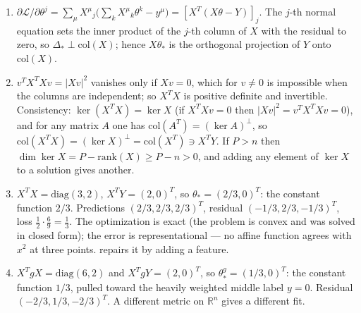 \documentclass[11pt]{article}
\newcommand{\R}{\mathbb{R}}
\newcommand{\CL}{{\mathcal L}}
\newcommand{\pd}{\partial}
\begin{document}
\begin{solution}
\begin{enumerate}
    \item $\pd\CL/\pd\theta^j = \sum_\mu X^\mu{}_j\big(\sum_k X^\mu{}_k\theta^k - y^\mu\big) = [X^T(X\theta-Y)]_j$. The $j$-th normal equation sets the inner product of the $j$-th column of $X$ with the residual to zero, so $\Delta_*\perp\mathrm{col}(X)$; hence $X\theta_*$ is the orthogonal projection of $Y$ onto $\mathrm{col}(X)$.
    \item $v^TX^TXv = |Xv|^2$ vanishes only if $Xv=0$, which for $v\neq 0$ is impossible when the columns are independent; so $X^TX$ is positive definite and invertible. Consistency: $\ker(X^TX) = \ker X$ (if $X^TXv=0$ then $|Xv|^2 = v^TX^TXv = 0$), and for any matrix $A$ one has $\mathrm{col}(A^T) = (\ker A)^\perp$, so $\mathrm{col}(X^TX) = (\ker X)^\perp = \mathrm{col}(X^T)\ni X^TY$. If $P>n$ then $\dim\ker X = P-\mathrm{rank}(X)\geq P-n>0$, and adding any element of $\ker X$ to a solution gives another.
    \item $X^TX = \mathrm{diag}(3,2)$, $X^TY = (2,0)^T$, so $\theta_* = (2/3,0)^T$: the constant function $2/3$. Predictions $(2/3,2/3,2/3)^T$, residual $(-1/3,2/3,-1/3)^T$, loss $\frac{1}{2}\cdot\frac{6}{9} = \frac{1}{3}$. The optimization is exact (the problem is convex and was solved in closed form); the error is representational --- no affine function agrees with $x^2$ at three points.  repairs it by adding a feature.
    \item $X^TgX = \mathrm{diag}(6,2)$ and $X^TgY = (2,0)^T$, so $\theta^g_* = (1/3,0)^T$: the constant function $1/3$, pulled toward the heavily weighted middle label $y=0$. Residual $(-2/3,1/3,-2/3)^T$. A different metric on $\R^n$ gives a different fit.
\end{enumerate}
\end{solution}
\end{document}
